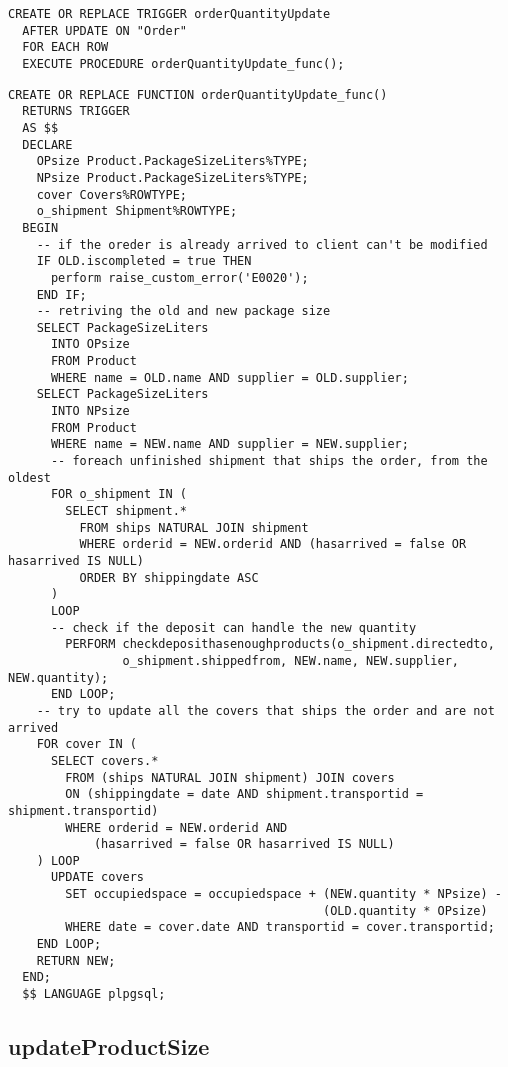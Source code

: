 \begin{lstlisting}[caption={Trigger per implementare \textbf{orderQuantityUpdate}}]
  CREATE OR REPLACE TRIGGER orderQuantityUpdate
  AFTER UPDATE ON "Order"
  FOR EACH ROW
  EXECUTE PROCEDURE orderQuantityUpdate_func();
\end{lstlisting}

\begin{lstlisting}[caption={Funzione \textbf{orderQuantityUpdate}}]
  CREATE OR REPLACE FUNCTION orderQuantityUpdate_func()
  RETURNS TRIGGER
  AS $$
  DECLARE
    OPsize Product.PackageSizeLiters%TYPE;
    NPsize Product.PackageSizeLiters%TYPE;
    cover Covers%ROWTYPE;
    o_shipment Shipment%ROWTYPE;
  BEGIN
    -- if the oreder is already arrived to client can't be modified
    IF OLD.iscompleted = true THEN
      perform raise_custom_error('E0020');
    END IF;
    -- retriving the old and new package size
    SELECT PackageSizeLiters
      INTO OPsize
      FROM Product
      WHERE name = OLD.name AND supplier = OLD.supplier;
    SELECT PackageSizeLiters
      INTO NPsize
      FROM Product
      WHERE name = NEW.name AND supplier = NEW.supplier;
      -- foreach unfinished shipment that ships the order, from the oldest
      FOR o_shipment IN (
        SELECT shipment.*
          FROM ships NATURAL JOIN shipment
          WHERE orderid = NEW.orderid AND (hasarrived = false OR hasarrived IS NULL)
          ORDER BY shippingdate ASC
      )
      LOOP
      -- check if the deposit can handle the new quantity
        PERFORM checkdeposithasenoughproducts(o_shipment.directedto, 
                o_shipment.shippedfrom, NEW.name, NEW.supplier, NEW.quantity);
      END LOOP;
    -- try to update all the covers that ships the order and are not arrived
    FOR cover IN (
      SELECT covers.* 
        FROM (ships NATURAL JOIN shipment) JOIN covers
        ON (shippingdate = date AND shipment.transportid = shipment.transportid)
        WHERE orderid = NEW.orderid AND 
            (hasarrived = false OR hasarrived IS NULL)
    ) LOOP
      UPDATE covers
        SET occupiedspace = occupiedspace + (NEW.quantity * NPsize) - 
                                            (OLD.quantity * OPsize)
        WHERE date = cover.date AND transportid = cover.transportid;
    END LOOP;
    RETURN NEW;
  END;
  $$ LANGUAGE plpgsql;
\end{lstlisting}

\subsection{\textbf{updateProductSize}}

